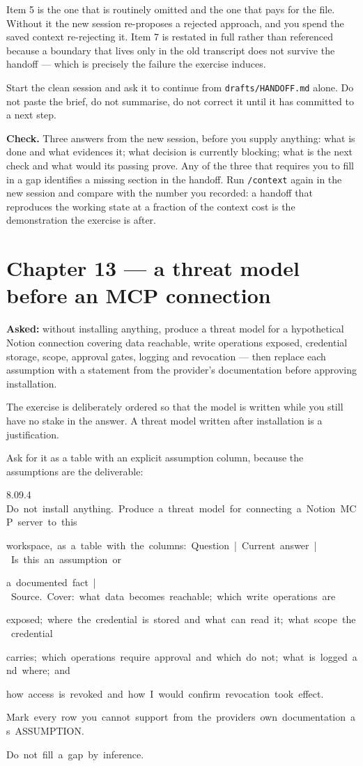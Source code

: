 \documentclass[11pt,a4paper,twoside,openany]{book}
\newcommand{\cl}[1]{\noindent\mbox{#1}\par}
\begin{document}
Item 5 is the one that is routinely omitted and the one that pays for the file. Without it the new session re-proposes a rejected approach, and you spend the saved context re-rejecting it. Item 7 is restated in full rather than referenced because a boundary that lives only in the old transcript does not survive the handoff — which is precisely the failure the exercise induces.


Start the clean session and ask it to continue from \texttt{drafts/\allowbreak{}HANDOFF.\allowbreak{}md} alone. Do not paste the brief, do not summarise, do not correct it until it has committed to a next step.


\textbf{Check.} Three answers from the new session, before you supply anything: what is done and what evidences it; what decision is currently blocking; what is the next check and what would its passing prove. Any of the three that requires you to fill in a gap identifies a missing section in the handoff. Run \texttt{/\allowbreak{}context} again in the new session and compare with the number you recorded: a handoff that reproduces the working state at a fraction of the context cost is the demonstration the exercise is after.


\FloatBarrier
\section*{Chapter 13 — a threat model before an MCP connection}

\textbf{Asked:} without installing anything, produce a threat model for a hypothetical Notion connection covering data reachable, write operations exposed, credential storage, scope, approval gates, logging and revocation — then replace each assumption with a statement from the provider's documentation before approving installation.


The exercise is deliberately ordered so that the model is written while you still have no stake in the answer. A threat model written after installation is a justification.


Ask for it as a table with an explicit assumption column, because the assumptions are the deliverable:


\begin{codeblock}{8.0}{9.4}
\cl{Do~not~install~anything.~Produce~a~threat~model~for~connecting~a~Notion~MCP~server~to~this}
\cl{workspace,~as~a~table~with~the~columns:~Question~|~Current~answer~|~Is~this~an~assumption~or}
\cl{a~documented~fact~|~Source.~Cover:~what~data~becomes~reachable;~which~write~operations~are}
\cl{exposed;~where~the~credential~is~stored~and~what~can~read~it;~what~scope~the~credential}
\cl{carries;~which~operations~require~approval~and~which~do~not;~what~is~logged~and~where;~and}
\cl{how~access~is~revoked~and~how~I~would~confirm~revocation~took~effect.}
\cl{}
\cl{Mark~every~row~you~cannot~support~from~the~provider\textquotesingle{}s~own~documentation~as~ASSUMPTION.}
\cl{Do~not~fill~a~gap~by~inference.}
\end{codeblock}
\end{document}
